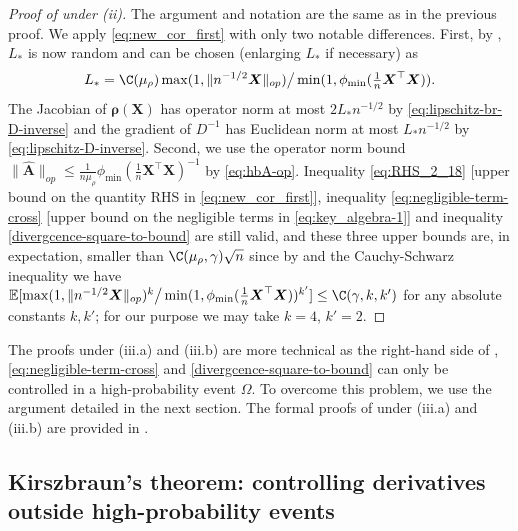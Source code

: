 \documentclass[11pt]{amsart}
\numberwithin{equation}{section}
\numberwithin{equation}{section}
\def\E{{\mathbb{E}}}
\def\mathbold{\boldsymbol} %
\def\bA{\mathbold{A}}\def\calA{{\cal A}}\def\scrA{{\mathscr A}}\def\Ahat{\widehat{A}}\def\Atil{{\widetilde A}}
\def\hbA{{\widehat{\bA}}}\def\tbA{{\widetilde{\bA}}}
\def\bX{\mathbold{X}}\def\hbX{{\widehat{\bX}}}\def\tbX{{\widetilde{\bX}}}\def\bXbar{{\overline \bX}}
\def\brho{\mathbold{\rho}}\def\rhohat{\widehat{\rho}}\def\hrho{\widehat{\rho}}
\begin{document}
{\begin{proof}[Proof of  under (ii)]
    The argument and notation are the same as in the previous proof.
    We apply \eqref{eq:new_cor_first} with only two notable differences.
    First,
    by ,
    $L_*$ is now random and can be chosen (enlarging $L_*$ if necessary) as 
    \begin{equation}
        \label{Lstar_ii}
L_* = \C(\mu_\rho) \max(1, \|n^{-1/2}\bX\|_{op})\big/ \min(1,\phi_{\min}(\tfrac 1 n \bX^\top\bX)).
    \end{equation}
    The Jacobian of $\brho(\bX)$ has operator
    norm at most $2L_* n^{-1/2}$ by \eqref{eq:lipschitz-br-D-inverse} and the gradient of $D^{-1}$ has
    Euclidean norm at most $L_* n^{-1/2}$ by
    \eqref{eq:lipschitz-D-inverse}.
    Second, we use the operator norm bound 
    $\|\hbA\|_{op} \le \frac{1}{n\mu_\rho} \phi_{\min}(\frac 1 n\bX^\top\bX)^{-1}$
    by \eqref{eq:hbA-op}.
    Inequality \eqref{eq:RHS_2_18} [upper bound on the quantity RHS in \eqref{eq:new_cor_first}], inequality \eqref{eq:negligible-term-cross} [upper bound on the negligible terms
    in \eqref{eq:key_algebra-1}] and
    inequality \eqref{divergcence-square-to-bound} are still valid,
    and these three upper bounds are, in expectation, smaller
    than $\C(\mu_\rho,\gamma) \sqrt n$ since by  and the Cauchy-Schwarz inequality
    we have
    $\E[\max(1, \|n^{-1/2}\bX\|_{op})^k\big/ \min(1,\phi_{\min}(\tfrac 1 n \bX^\top\bX))^{k'}]\le \C(\gamma,k,k')$ for any absolute constants
    $k,k'$; for our purpose we may take $k=4$, $k'=2$.
\end{proof}

The proofs under (iii.a) and (iii.b) are
more technical as the right-hand side of ,
\eqref{eq:negligible-term-cross} and \eqref{divergcence-square-to-bound}
can only be controlled in a high-probability event $\Omega$.
To overcome this problem, we use the argument detailed in the next section.
The formal proofs of 
under (iii.a) and (iii.b)
are provided in .

\subsection{Kirszbraun's theorem:
controlling derivatives outside high-probability events
}
\label{sec:kirszbraun}

}
\end{document}
